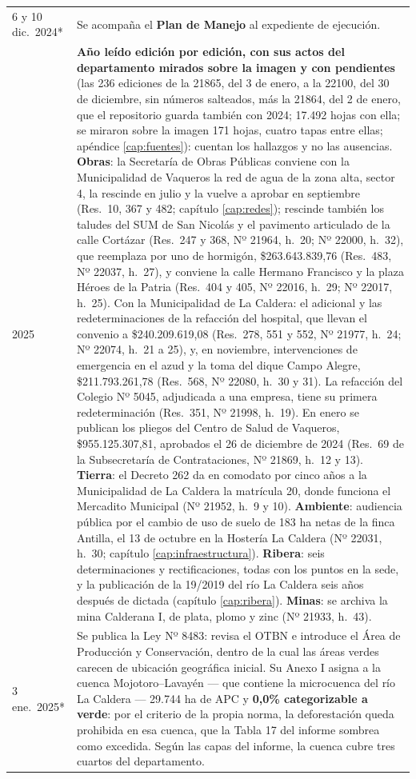 \begin{longtable}{@{}p{2.7cm}p{10.3cm}@{}}
6 y 10 dic.\ 2024* & Se acompaña el \textbf{Plan de Manejo} al expediente de ejecución. \\
2025 & \textbf{Año leído edición por edición, con sus actos del departamento mirados sobre la imagen y con pendientes} (las 236 ediciones de la 21865, del 3 de enero, a la 22100, del 30 de diciembre, sin números salteados, más la 21864, del 2 de enero, que el repositorio guarda también con 2024; 17.492 hojas con ella; se miraron sobre la imagen 171 hojas, cuatro tapas entre ellas; apéndice \ref{cap:fuentes}): cuentan los hallazgos y no las ausencias. \textbf{Obras}: la Secretaría de Obras Públicas conviene con la Municipalidad de Vaqueros la red de agua de la zona alta, sector 4, la rescinde en julio y la vuelve a aprobar en septiembre (Res.\ 10, 367 y 482; capítulo \ref{cap:redes}); rescinde también los taludes del SUM de San Nicolás y el pavimento articulado de la calle Cortázar (Res.\ 247 y 368, Nº 21964, h.\ 20; Nº 22000, h.\ 32), que reemplaza por uno de hormigón, \$263.643.839,76 (Res.\ 483, Nº 22037, h.\ 27), y conviene la calle Hermano Francisco y la plaza Héroes de la Patria (Res.\ 404 y 405, Nº 22016, h.\ 29; Nº 22017, h.\ 25). Con la Municipalidad de La Caldera: el adicional y las redeterminaciones de la refacción del hospital, que llevan el convenio a \$240.209.619,08 (Res.\ 278, 551 y 552, Nº 21977, h.\ 24; Nº 22074, h.\ 21 a 25), y, en noviembre, intervenciones de emergencia en el azud y la toma del dique Campo Alegre, \$211.793.261,78 (Res.\ 568, Nº 22080, h.\ 30 y 31). La refacción del Colegio Nº 5045, adjudicada a una empresa, tiene su primera redeterminación (Res.\ 351, Nº 21998, h.\ 19). En enero se publican los pliegos del Centro de Salud de Vaqueros, \$955.125.307,81, aprobados el 26 de diciembre de 2024 (Res.\ 69 de la Subsecretaría de Contrataciones, Nº 21869, h.\ 12 y 13). \textbf{Tierra}: el Decreto 262 da en comodato por cinco años a la Municipalidad de La Caldera la matrícula 20, donde funciona el Mercadito Municipal (Nº 21952, h.\ 9 y 10). \textbf{Ambiente}: audiencia pública por el cambio de uso de suelo de 183 ha netas de la finca Antilla, el 13 de octubre en la Hostería La Caldera (Nº 22031, h.\ 30; capítulo \ref{cap:infraestructura}). \textbf{Ribera}: seis determinaciones y rectificaciones, todas con los puntos en la sede, y la publicación de la 19/2019 del río La Caldera seis años después de dictada (capítulo \ref{cap:ribera}). \textbf{Minas}: se archiva la mina Calderana I, de plata, plomo y zinc (Nº 21933, h.\ 43). \\
3 ene.\ 2025* & Se publica la Ley Nº 8483: revisa el OTBN e introduce el Área de Producción y Conservación, dentro de la cual las áreas verdes carecen de ubicación geográfica inicial. Su Anexo I asigna a la cuenca Mojotoro--Lavayén --- que contiene la microcuenca del río La Caldera --- 29.744 ha de APC y \textbf{0,0\% categorizable a verde}: por el criterio de la propia norma, la deforestación queda prohibida en esa cuenca, que la Tabla 17 del informe sombrea como excedida. Según las capas del informe, la cuenca cubre tres cuartos del departamento. \\

\end{longtable}
